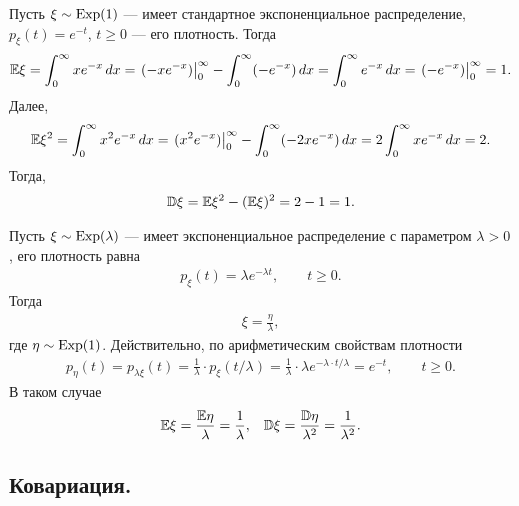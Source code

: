 \documentclass[../main.tex]{subfiles}
\begin{document}
   \begin{exmpl}
    Пусть $ \xi\sim\mathrm{Exp}(1) $ --- имеет стандартное экспоненциальное распределение,  $ p_\xi(t) = e^{-t} $, $ t \geqslant 0 $ --- его плотность. Тогда
    \begin{align*}
     \mathbb E\xi = \int_{0}^{\infty} xe^{-x}\,dx = \left.(-xe^{-x})\right|_0^{\infty} - \int_{0}^{\infty} (-e^{-x})\,dx = \int_{0}^{\infty} e^{-x}\,dx = \left.(-e^{-x})\right|_0^{\infty} = 1.
      \end{align*} Далее,
      \begin{align*}
       \mathbb E\xi^{2} = \int_{0}^{\infty} x^{2}e^{-x}\,dx = \left.(x^{2}e^{-x})\right|_0^{\infty} - \int_{0}^{\infty} (-2xe^{-x})\,dx = 2 \int_{0}^{\infty} xe^{-x}\,dx = 2.
       \end{align*} Тогда,
       \begin{align*}
        \mathbb D\xi = \mathbb E\xi^{2} - (\mathbb E\xi)^{2} = 2 - 1 = 1.
       \end{align*}
      \end{exmpl}
      \begin{exmpl}
       Пусть $ \xi\sim\mathrm{Exp}(\lambda) $ --- имеет экспоненциальное распределение с параметром $ \lambda > 0 $, его плотность равна
       \begin{align*}
        p_\xi(t) = \lambda e^{-\lambda t}, \qquad t \geqslant 0.
       \end{align*} Тогда
       \begin{align*}
        \xi = \frac{\eta}{\lambda},
       \end{align*} где $ \eta \sim \mathrm{Exp}(1) $. Действительно, по арифметическим свойствам плотности
       \begin{align*}
        p_\eta(t) = p_{\lambda \xi}(t) = \frac{1}{\lambda} \cdot  p_\xi(t / \lambda) = \frac{1}{\lambda} \cdot \lambda e^{-\lambda \cdot t / \lambda} = e^{-t}, \qquad t \geqslant 0.
       \end{align*} В таком случае
       \begin{align*}
        \mathbb E\xi = \frac{\mathbb E\eta}{\lambda} = \frac{1}{\lambda}, && \mathbb D\xi = \frac{\mathbb D\eta}{\lambda^{2}} = \frac{1}{\lambda^{2}}.
       \end{align*}
      \end{exmpl}

      \subsection{Ковариация.}
\end{document}

